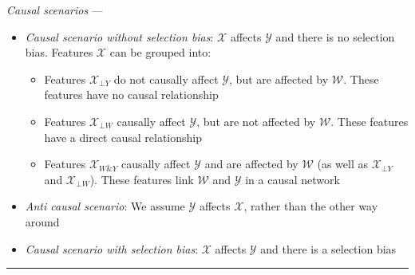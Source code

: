 \emph{Causal scenarios} --- 
\begin{itemize}
    \item \emph{Causal scenario without selection bias}: $\mathcal{X}$ affects $\mathcal{Y}$ and there is no selection bias. Features $\mathcal{X}$ can be grouped into:
    \begin{itemize}
        \item Features $\mathcal{X}_{\bot Y}$ do not causally affect $\mathcal{Y}$, but are affected by $\mathcal{W}$. These features have no causal relationship
        \item Features $\mathcal{X}_{\bot W}$ causally affect $\mathcal{Y}$, but are not affected by $\mathcal{W}$. These features have a direct causal relationship
        \item Features $\mathcal{X}_{W \& Y}$ causally affect $\mathcal{Y}$ and are affected by $\mathcal{W}$ (as well as $\mathcal{X}_{\bot Y}$ and $\mathcal{X}_{\bot W}$). These features link $\mathcal{W}$ and $\mathcal{Y}$ in a causal network
    \end{itemize}
    \item \emph{Anti causal scenario}: We assume $\mathcal{Y}$ affects $\mathcal{X}$, rather than the other way around
    \item \emph{Causal scenario with selection bias}: $\mathcal{X}$ affects $\mathcal{Y}$ and there is a selection bias 
\end{itemize}

{\color{lightgray}\hrule height 0.001mm}

